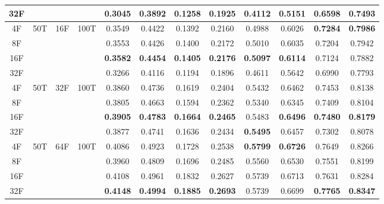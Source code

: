 \begin{table}[t]
\begin{tabular}{@{}c@{\hspace{3pt}}c@{\hspace{6pt}}c@{\hspace{3pt}}c@{\hspace{6pt}}*{7}{c@{\hspace{3pt}}}c@{}}
32F &                      &                       &                       & 0.3045 & 0.3892 & 0.1258 & 0.1925 & 0.4112 & 0.5151 & 0.6598 & 0.7493 \\
\midrule
4F  & \multirow{4}{*}{50T} & \multirow{4}{*}{16F}  & \multirow{4}{*}{100T} & 0.3549 & 0.4422 & 0.1392 & 0.2160 & 0.4988 & 0.6026 & \textbf{0.7284} & \textbf{0.7986} \\
8F  &                      &                       &                       & 0.3553 & 0.4426 & 0.1400 & 0.2172 & 0.5010 & 0.6035 & 0.7204 & 0.7942 \\
16F &                      &                       &                       & \textbf{0.3582} & \textbf{0.4454} & \textbf{0.1405} & \textbf{0.2176} & \textbf{0.5097} & \textbf{0.6114} & 0.7124 & 0.7882 \\
32F &                      &                       &                       & 0.3266 & 0.4116 & 0.1194 & 0.1896 & 0.4611 & 0.5642 & 0.6990 & 0.7793 \\
\midrule
4F  & \multirow{4}{*}{50T} & \multirow{4}{*}{32F}  & \multirow{4}{*}{100T} & 0.3860 & 0.4736 & 0.1619 & 0.2404 & 0.5432 & 0.6462 & 0.7453 & 0.8138 \\
8F  &                      &                       &                       & 0.3805 & 0.4663 & 0.1594 & 0.2362 & 0.5340 & 0.6345 & 0.7409 & 0.8104 \\
16F &                      &                       &                       & \textbf{0.3905} & \textbf{0.4783} & \textbf{0.1664} & \textbf{0.2465} & 0.5483 & \textbf{0.6496} & \textbf{0.7480} & \textbf{0.8179} \\
32F &                      &                       &                       & 0.3877 & 0.4741 & 0.1636 & 0.2434 & \textbf{0.5495} & 0.6457 & 0.7302 & 0.8078 \\
\midrule
4F  & \multirow{4}{*}{50T} & \multirow{4}{*}{64F}  & \multirow{4}{*}{100T} & 0.4086 & 0.4923 & 0.1728 & 0.2538 & \textbf{0.5799} & \textbf{0.6726} & 0.7649 & 0.8266 \\
8F  &                      &                       &                       & 0.3960 & 0.4809 & 0.1696 & 0.2485 & 0.5560 & 0.6530 & 0.7551 & 0.8199 \\
16F &                      &                       &                       & 0.4108 & 0.4961 & 0.1832 & 0.2627 & 0.5739 & 0.6713 & 0.7631 & 0.8284 \\
32F &                      &                       &                       & \textbf{0.4148} & \textbf{0.4994} & \textbf{0.1885} & \textbf{0.2693} & 0.5739 & 0.6699 & \textbf{0.7765} & \textbf{0.8347} \\

\end{tabular}
\end{table}
